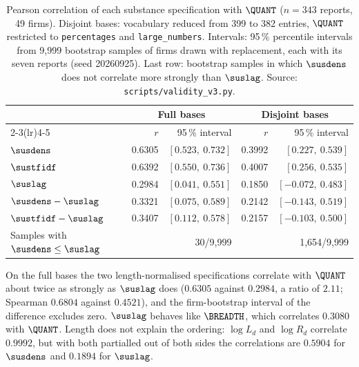 \begin{table}[tbp]
\centering
\small
\caption{Pearson correlation of each substance specification with $\QUANT$
($n = 343$ reports, 49 firms). Disjoint bases: vocabulary reduced from 399 to
382 entries, $\QUANT$ restricted to \texttt{percentages} and
\texttt{large\_numbers}. Intervals: 95\,\% percentile intervals from 9{,}999
bootstrap samples of firms drawn with replacement, each with its seven reports
(seed 20260925). Last row: bootstrap samples in which $\susdens$ does not
correlate more strongly than $\suslag$. Source:
\nolinkurl{scripts/validity_v3.py}.}
\label{tab:validity-disjoint}
\begin{tabular}{@{}lrrrr@{}}
\toprule
 & \multicolumn{2}{c}{Full bases} & \multicolumn{2}{c}{Disjoint bases} \\
\cmidrule(lr){2-3}\cmidrule(lr){4-5}
 & $r$ & 95\,\% interval & $r$ & 95\,\% interval \\
\midrule
$\susdens$  & 0.6305 & $[0.523,\ 0.732]$ & 0.3992 & $[0.227,\ 0.539]$ \\
$\sustfidf$ & 0.6392 & $[0.550,\ 0.736]$ & 0.4007 & $[0.256,\ 0.535]$ \\
$\suslag$   & 0.2984 & $[0.041,\ 0.551]$ & 0.1850 & $[-0.072,\ 0.483]$ \\
\addlinespace
$\susdens - \suslag$  & 0.3321 & $[0.075,\ 0.589]$ & 0.2142 & $[-0.143,\ 0.519]$ \\
$\sustfidf - \suslag$ & 0.3407 & $[0.112,\ 0.578]$ & 0.2157 & $[-0.103,\ 0.500]$ \\
Samples with $\susdens \le \suslag$ & \multicolumn{2}{r}{30/9{,}999} & \multicolumn{2}{r}{1{,}654/9{,}999} \\
\bottomrule
\end{tabular}
\end{table}

On the full bases the two length-normalised specifications correlate with
$\QUANT$ about twice as strongly as $\suslag$ does ($0.6305$ against $0.2984$,
a ratio of $2.11$; Spearman $0.6804$ against $0.4521$), and the firm-bootstrap
interval of the difference excludes zero. $\suslag$ behaves like $\BREADTH$,
which correlates $0.3080$ with $\QUANT$. Length does not explain the ordering:
$\log L_d$ and $\log R_d$ correlate $0.9992$, but with both partialled out of
both sides the correlations are $0.5904$ for $\susdens$ and $0.1894$ for
$\suslag$.

